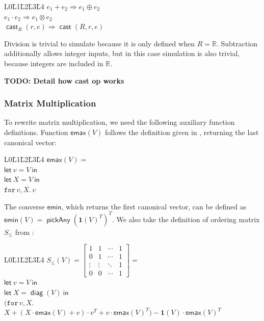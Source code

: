 \documentclass{article}
\DeclareMathOperator{\pickAny}{\mathsf{pickAny}}
\DeclareMathOperator{\cast}{\mathsf{cast}}
\newcommand{\transp}[1]{#1^T}
\newcommand{\SyntaxStyle}{\mathsf}
\newcommand{\rowdom}{\mathbf{1}}
\DeclareMathOperator{\diag}{\mathsf{diag}}
\newcommand{\one}{\rowdom}
\newcommand{\RR}{\mathbb{R}}
\begin{document}
\begin{tabbing}
    L0\=L1\=L2\=L3\=L4 \kill
    $e_1 + e_2 \Rightarrow e_1 \oplus e_2$ \\
    $e_1 \cdot e_2 \Rightarrow e_1 \otimes e_2$ \\
    $\cast_R(r,e) \Rightarrow \cast(R, r, e)$ \\
\end{tabbing}

Division is trivial to simulate because it is only defined when $R = \RR$.
Subtraction additionally allows integer inputs, but in this case simulation is also trivial, because integers are included in $\RR$.

\textbf{TODO: Detail how cast op works}

\subsubsection*{Matrix Multiplication}
To rewrite matrix multiplication, we need the following auxiliary function definitions.
Function $\mathsf{emax}(V)$ follows the definition given in \cite{geerts_expressive_2021}, returning the last canonical vector:

\begin{tabbing}
    L0\=L1\=L2\=L3\=L4 \kill
    $\mathsf{emax}(V) = $\\
    $\SyntaxStyle{let}\ v = V \ \SyntaxStyle{in}$ \\
    $\SyntaxStyle{let}\ X = V \ \SyntaxStyle{in}$ \\
    $\texttt{for}\, v,X \texttt{.}\, v$
\end{tabbing}

The converse $\mathsf{emin}$, which returns the first canonical vector, can be defined as $\mathsf{emin}(V) = \transp{\pickAny(\transp{\one(V)})}$.
We also take the definition of ordering matrix $S_{\leq}$ from \cite{geerts_expressive_2021}:

\begin{tabbing}
    L0\=L1\=L2\=L3\=L4 \kill
    $S_{\leq}(V) = \begin{bmatrix}
            1      & 1      & \cdots & 1 \\
            0      & 1      & \cdots & 1 \\
            \vdots & \vdots & \ddots & 1 \\
            0      & 0      & \cdots & 1
        \end{bmatrix} = $\\
    $\SyntaxStyle{let}\ v = V \ \SyntaxStyle{in}$ \\
    $\SyntaxStyle{let}\ X = \diag(V) \ \SyntaxStyle{in}$ \\
    $(\texttt{for}\, v,X \texttt{.}$\\
    \>$X
        + (X \cdot \mathsf{emax}(V) + v) \cdot \transp{v}
        + v \cdot \transp{\mathsf{emax}(V)}
        ) - \one(V) \cdot \transp{\mathsf{emax}(V)}$\\
\end{tabbing}
\end{document}
